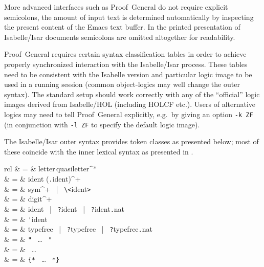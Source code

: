 \begin{isabellebody}
\begin{isamarkuptext}
  More advanced interfaces such as Proof~General \cite{proofgeneral}
  do not require explicit semicolons, the amount of input text is
  determined automatically by inspecting the present content of the
  Emacs text buffer.  In the printed presentation of Isabelle/Isar
  documents semicolons are omitted altogether for readability.

  \begin{warn}
    Proof~General requires certain syntax classification tables in
    order to achieve properly synchronized interaction with the
    Isabelle/Isar process.  These tables need to be consistent with
    the Isabelle version and particular logic image to be used in a
    running session (common object-logics may well change the outer
    syntax).  The standard setup should work correctly with any of the
    ``official'' logic images derived from Isabelle/HOL (including
    HOLCF etc.).  Users of alternative logics may need to tell
    Proof~General explicitly, e.g.\ by giving an option \verb,-k ZF,
    (in conjunction with \verb,-l ZF, to specify the default logic
    image).
  \end{warn}%
\end{isamarkuptext}%
\isamarkuptrue%
%
\isamarkuptrue%
%
\begin{isamarkuptext}%
The Isabelle/Isar outer syntax provides token classes as presented
  below; most of these coincide with the inner lexical syntax as
  presented in \cite{isabelle-ref}.

  \begin{matharray}{rcl}
     & = & letter\,quasiletter^* \\
     & = & ident (\verb,.,ident)^+ \\
     & = & sym^+ ~|~ \verb,\,\verb,<,ident\verb,>, \\
     & = & digit^+ \\
     & = & ident ~|~ \verb,?,ident ~|~ \verb,?,ident\verb,.,nat \\
     & = & \verb,',ident \\
     & = & typefree ~|~ \verb,?,typefree ~|~ \verb,?,typefree\verb,.,nat \\
     & = & \verb,", ~\dots~ \verb,", \\
     & = & \backquote ~\dots~ \backquote \\
     & = & \verb,{*, ~\dots~ \verb,*,\verb,}, \\[1ex]


\end{matharray}
\end{isamarkuptext}
\end{isabellebody}
